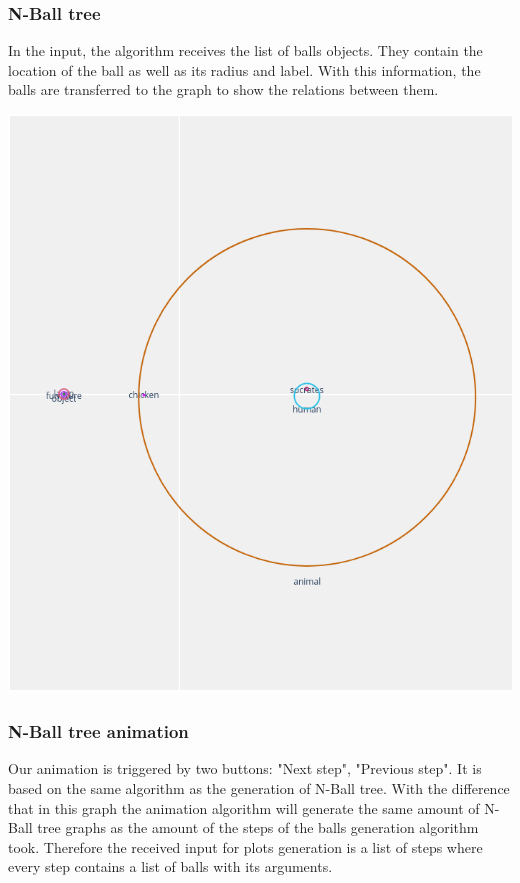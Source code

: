 \documentclass[]{article}
\begin{document}
\subsubsection{N-Ball tree}

In the input, the algorithm receives the list of balls objects. They contain the location of the ball as well as its radius and label. With this information, the balls are transferred to the graph to show the relations between them.

\includegraphics[width=\textwidth]{res/balls_graph.png}

\subsubsection{N-Ball tree animation}

Our animation is triggered by two buttons: "Next step", "Previous step". It is based on the same algorithm as the generation of N-Ball tree. With the difference that in this graph the animation algorithm will generate the same amount of N-Ball tree graphs as the amount of the steps of the balls generation algorithm took.  Therefore the received input for plots generation is a list of steps where every step contains a list of balls with its arguments.
\end{document}
